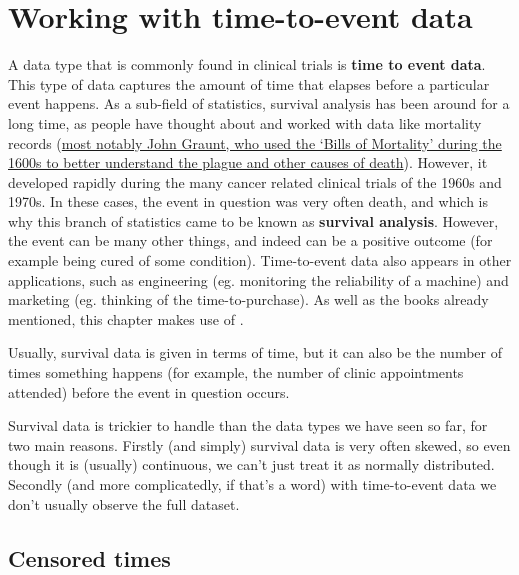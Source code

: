 \documentclass[
  openany]{book}
\theoremstyle{definition}
\theoremstyle{definition}
\theoremstyle{definition}
\theoremstyle{definition}
\theoremstyle{remark}
\begin{document}
\chapter{Working with time-to-event data}\label{working-with-time-to-event-data}

A data type that is commonly found in clinical trials is \textbf{time to event data}. This type of data captures the amount of time that elapses before a particular event happens. As a sub-field of statistics, survival analysis has been around for a long time, as people have thought about and worked with data like mortality records (\href{https://rss.onlinelibrary.wiley.com/doi/full/10.1111/1740-9713.01421}{most notably John Graunt, who used the `Bills of Mortality' during the 1600s to better understand the plague and other causes of death}). However, it developed rapidly during the many cancer related clinical trials of the 1960s and 1970s. In these cases, the event in question was very often death, and which is why this branch of statistics came to be known as \textbf{survival analysis}. However, the event can be many other things, and indeed can be a positive outcome (for example being cured of some condition). Time-to-event data also appears in other applications, such as engineering (eg. monitoring the reliability of a machine) and marketing (eg. thinking of the time-to-purchase). As well as the books already mentioned, this chapter makes use of \citet{collett_surv}.

Usually, survival data is given in terms of time, but it can also be the number of times something happens (for example, the number of clinic appointments attended) before the event in question occurs.

Survival data is trickier to handle than the data types we have seen so far, for two main reasons. Firstly (and simply) survival data is very often skewed, so even though it is (usually) continuous, we can't just treat it as normally distributed. Secondly (and more complicatedly, if that's a word) with time-to-event data we don't usually observe the full dataset.

\section{Censored times}\label{censored-times}
\end{document}
